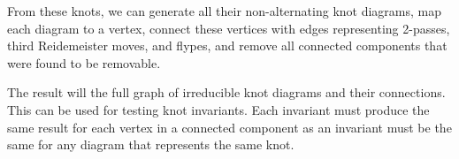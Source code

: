 \begin{paper}
From these knots, we can generate all their non-alternating knot diagrams,
map each diagram to a vertex, connect these vertices with edges representing
2-passes, third Reidemeister moves, and flypes, and remove all connected
components that were found to be removable.

The result will the full graph of irreducible knot diagrams and their
connections.
This can be used for testing knot invariants.
Each invariant must produce the same result for each vertex in a connected
component as an invariant must be the same for any diagram that represents the
same knot.



\end{paper}

